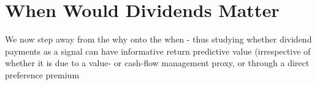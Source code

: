 \documentclass[
]{article}
\begin{document}
\hypertarget{when-would-dividends-matter}{%
\section{When Would Dividends
Matter}\label{when-would-dividends-matter}}

We now step away from the why onto the when - thus studying whether
dividend payments as a signal can have informative return predictive
value (irrespective of whether it is due to a value- or cash-flow
management proxy, or through a direct preference premium
\end{document}
